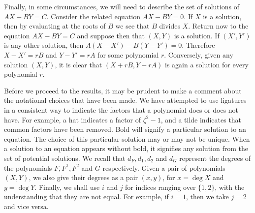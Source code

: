 Finally, in some circumstances, we will need to describe the set of solutions of $AX-BY=C$. Consider the related equation $AX-BY = 0$. If $X$ is a solution, then by evaluating at the roots of $B$ we see that $B$ divides $X$. Return now to the equation $AX-BY=C$ and suppose then that $(X,Y)$ is a solution. If $(X',Y')$ is any other solution, then $A(X-X') - B(Y-Y') = 0$. Therefore $X-X' = r B$ and $Y-Y' = rA$ for some polynomial $r$. Conversely, given any solution $(X,Y)$, it is clear that $(X+rB,Y+rA)$ is again a solution for every polynomial $r$.

Before we proceed to the results, it may be prudent to make a comment about the notational choices that have been made. We have attempted to use ligatures in a consistent way to indicate the factors that a polynomial does or does not have. For example, a hat indicates a factor of $ζ^2-1$, and a tilde indicates that common factors have been removed. Bold will signify a particular solution to an equation. The choice of this particular solution may or may not be unique. When a solution to an equation appears without bold, it signifies any solution from the set of potential solutions. We recall that $d_F, d_1, d_2$ and $d_G$ represent the degrees of the polynomials $F,F^1,F^2$ and $G$ respectively. Given a pair of polynomials $(X,Y)$, we also give their degrees as a pair $(x,y)$, for $x=\deg X$ and $y=\deg Y$. Finally, we shall use $i$ and $j$ for indices ranging over $\{1,2\}$, with the understanding that they are not equal. For example, if $i=1$, then we take $j=2$ and vice versa.




